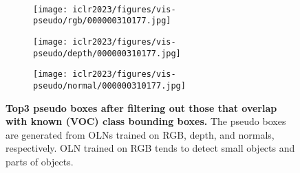 \documentclass{article} \usepackage{iclr2023_conference,times}
\begin{document}
\begin{figure}
\begin{subfigure}[b]{0.32\textwidth}
\label{fig:y equals x}
     \end{subfigure}
     \\
     \begin{subfigure}[b]{0.32\textwidth}
         \centering
         \texttt{[image: iclr2023/figures/vis-pseudo/rgb/000000310177.jpg]}
\label{fig:three sin x}
     \end{subfigure}
     \begin{subfigure}[b]{0.32\textwidth}
         \centering
         \texttt{[image: iclr2023/figures/vis-pseudo/depth/000000310177.jpg]}
\label{fig:five over x}
     \end{subfigure} 
     \begin{subfigure}[b]{0.32\textwidth}
         \centering
         \texttt{[image: iclr2023/figures/vis-pseudo/normal/000000310177.jpg]}
\label{fig:y equals x}
     \end{subfigure}

\caption{\textbf{Top3 pseudo boxes after filtering out those that overlap with known (VOC) class bounding boxes.} The pseudo boxes are generated from OLNs trained on RGB, depth, and normals, respectively.
OLN trained on RGB tends to detect small objects and parts of objects.}
        \label{fig:pseudo-1}
\end{figure}
\end{document}
